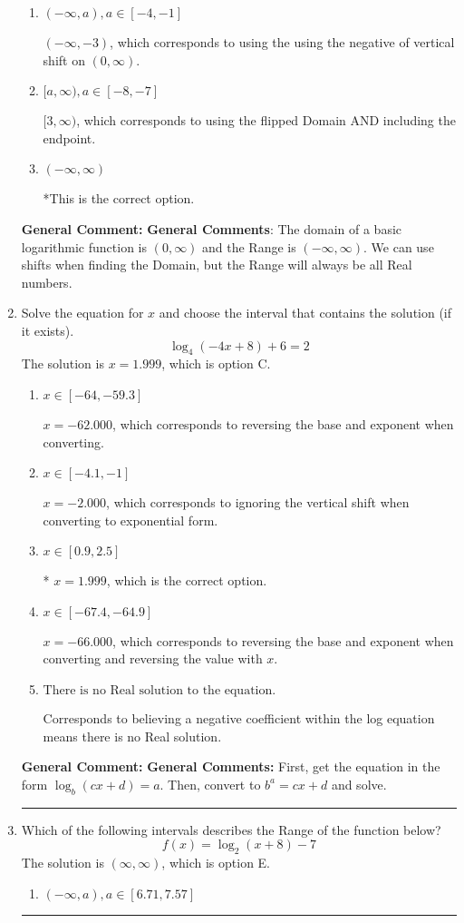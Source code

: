 \documentclass{extbook}[14pt]
\newcommand{\litem}[1]{\item #1

\rule{\textwidth}{0.4pt}}
\begin{document}
\begin{enumerate}
{\begin{enumerate}[label=\Alph*.]
$(-\infty, 3)$, which corresponds to using the vertical shift while the Range is $(-\infty, \infty)$.
\item \( (-\infty, a), a \in [-4, -1] \)

$(-\infty, -3)$, which corresponds to using the using the negative of vertical shift on $(0, \infty)$.
\item \( [a, \infty), a \in [-8, -7] \)

$[3, \infty)$, which corresponds to using the flipped Domain AND including the endpoint.
\item \( (-\infty, \infty) \)

*This is the correct option.
\end{enumerate}

\textbf{General Comment:} \textbf{General Comments}: The domain of a basic logarithmic function is $(0, \infty)$ and the Range is $(-\infty, \infty)$. We can use shifts when finding the Domain, but the Range will always be all Real numbers.
}
\litem{
Solve the equation for $x$ and choose the interval that contains the solution (if it exists).
\[ \log_{4}{(-4x+8)}+6 = 2 \]The solution is \( x = 1.999 \), which is option C.\begin{enumerate}[label=\Alph*.]
\item \( x \in [-64, -59.3] \)

$x = -62.000$, which corresponds to reversing the base and exponent when converting.
\item \( x \in [-4.1, -1] \)

$x = -2.000$, which corresponds to ignoring the vertical shift when converting to exponential form.
\item \( x \in [0.9, 2.5] \)

* $x = 1.999$, which is the correct option.
\item \( x \in [-67.4, -64.9] \)

$x = -66.000$, which corresponds to reversing the base and exponent when converting and reversing the value with $x$.
\item \( \text{There is no Real solution to the equation.} \)

Corresponds to believing a negative coefficient within the log equation means there is no Real solution.
\end{enumerate}

\textbf{General Comment:} \textbf{General Comments:} First, get the equation in the form $\log_b{(cx+d)} = a$. Then, convert to $b^a = cx+d$ and solve.
}
\litem{
Which of the following intervals describes the Range of the function below?
\[ f(x) = \log_2{(x+8)}-7 \]The solution is \( (\infty, \infty) \), which is option E.\begin{enumerate}[label=\Alph*.]
\item \( (-\infty, a), a \in [6.71, 7.57] \)


\end{enumerate}}
\end{enumerate}
\end{document}
